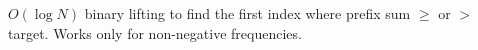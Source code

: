 
$O(\log N)$ binary lifting to find the first index where prefix sum $\ge$ or $>$ target. Works only for non-negative frequencies.


